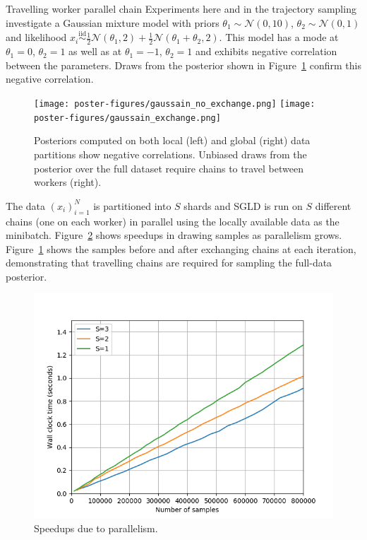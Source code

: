 \documentclass[final]{beamer}
\newlength{\onecolwid}
\newlength{\twocolwid}
\begin{document}
\begin{frame}[t]
\begin{columns}[t]
\begin{column}{\twocolwid}
\begin{columns}[t,totalwidth=\twocolwid]
\begin{column}{\onecolwid}
\begin{block}{Travelling worker parallel chain}
  Experiments here and in the trajectory sampling investigate a Gaussian mixture model
  with priors $\theta_1 \sim \mathcal{N}(0,10)$, $\theta_2 \sim \mathcal{N}(0,1)$ and
  likelihood
  $x_i \overset{\text{iid}}{\sim} \frac{1}{2}\mathcal{N}(\theta_1, 2) + \frac{1}{2}\mathcal{N}(\theta_1 + \theta_2, 2)$.
  This model has a mode at $\theta_1 = 0$, $\theta_2 = 1$ as well as at
  $\theta_1 = -1$, $\theta_2 = 1$ and exhibits negative correlation
  between the parameters. Draws from the posterior shown in Figure~\ref{fig:travelling-chain-samples}
  confirm this negative correlation.

  \begin{figure}
    \texttt{[image: poster-figures/gaussain\_no\_exchange.png]}
    \texttt{[image: poster-figures/gaussain\_exchange.png]}
    \caption{Posteriors computed on both local (left) and global (right) data partitions show negative correlations.
      Unbiased draws from the posterior over the full dataset require chains to travel between workers (right).}
    \label{fig:travelling-chain-samples}
  \end{figure}

  The data $(x_i)_{i=1}^N$ is partitioned into $S$ shards and SGLD is run on
  $S$ different chains (one on each worker) in parallel using the locally
  available data as the minibatch. Figure~\ref{fig:speedup-partitioning} shows
  speedups in drawing samples as parallelism grows.
  Figure~\ref{fig:travelling-chain-samples} shows
  the samples before and after exchanging chains at each iteration, demonstrating that
  travelling chains are required for sampling the full-data posterior.

  \begin{figure}
    \includegraphics[width=0.99\linewidth]{poster-figures/speedup-parallel.png}
    \caption{Speedups due to parallelism.}
    \label{fig:speedup-partitioning}
  \end{figure}


\end{block}
\end{column}
\end{columns}
\end{column}
\end{columns}
\end{frame}
\end{document}
